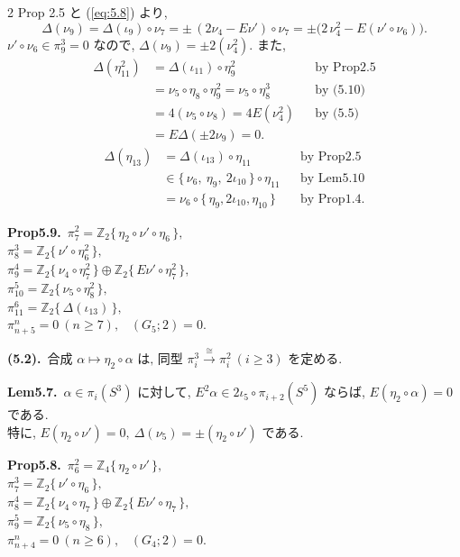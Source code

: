 \documentclass[10pt, leqno]{ltjsarticle}
\newcommand{\toda}[1]{\{\,#1\,\}}              %
\newcommand{\gen}[1]{\{\,#1\,\}}       %
\numberwithin{equation}{section}
\theoremstyle{plain}
\theoremstyle{definition}
\theoremstyle{remark}
\begin{document}
\begin{paracol}{2}
Prop 2.5 と (\ref{eq:5.8}) より,
\[
\Delta(\nu_9)=\Delta(\iota_9)\circ \nu_7=\pm\,(2\nu_4-E\nu')\circ \nu_7
=\pm\big(2\,\nu_4^{2}-E(\nu'\circ \nu_6)\big).
\]
\(\nu'\circ \nu_6\in \pi^{3}_{9}=0\) なので, 
\(\Delta(\nu_9)=\pm 2(\nu_4^{2}) .\) また,
\[
\begin{align*}
\Delta(\eta^{2}_{11})
& =  \Delta(\iota_{11})\circ \eta_9^2
&& \text{by Prop2.5}\\
& =  \nu_5\circ \eta_8\circ \eta_9^2
= \nu_5\circ \eta_8^{3}
&& \text{by (5.10)}\\
& =  4(\nu_5\circ\nu_8)
= 4E(\nu_4^2)
&& \text{by (5.5)}\\
& =  E\Delta(\pm2\nu_9)
=0 .
\end{align*}
\]
\[
\begin{align*}
\Delta(\eta_{13})
& =  \Delta(\iota_{13})\circ \eta_{11}
&& \text{by Prop2.5}\\
& \in \toda{ \nu_6,\ \eta_9,\ 2\iota_{10} }\circ \eta_{11}
&& \text{by Lem5.10}\\
& =  \nu_6\circ\toda{\eta_9,2\iota_{10},\eta_{10}} 
&& \text{by Prop1.4}.
\end{align*}
\]

\switchcolumn

\noindent
\textbf{Prop5.9.}\
\(\pi^{2}_{7}=\mathbb Z_2\gen{\eta_{2}\circ\nu'\circ\eta_6},\) \\
\(\pi^{3}_{8}=\mathbb Z_2\gen{\nu'\circ\eta_6^2},\) \\
\(\pi^{4}_{9}=\mathbb Z_2\gen{\nu_{4}\circ\eta_7^2}\oplus \mathbb Z_2\gen{E\nu'\circ\eta_7^2},\) \\
\(\pi^{5}_{10}=\mathbb Z_2\gen{\nu_{5}\circ\eta_8^2},\) \\
\(\pi^{6}_{11}=\mathbb Z_2\gen{\Delta(\iota_{13})},\) \\
\(\pi^{n}_{n+5}=0\ (n\ge7),\) \
\((G_{5};2)=0.\)

\noindent
\textbf{(5.2).}\
\(\text{合成 } \alpha\longmapsto \eta_2\circ \alpha \text{ は, 同型 } 
\pi^{3}_{i}\xrightarrow{\cong}\pi^{2}_{i}\ (i\ge3) 
\text{ を定める. }\)

\noindent
\textbf{Lem5.7.}\
\(\alpha\in\pi_i(S^3)\) に対して,
\(E^2\alpha\in2\iota_5\circ\pi_{i+2}(S^5)\) ならば, 
\(E(\eta_2\circ\alpha)=0\) である. \\
特に, \(E(\eta_2\circ\nu')=0, \ \Delta(\nu_5)=\pm(\eta_2\circ\nu')\) である. 

\noindent
\textbf{Prop5.8.}\
\(\pi^{2}_{6}=\mathbb Z_4\gen{\eta_{2}\circ\nu'},\) \\
\(\pi^{3}_{7}=\mathbb Z_2\gen{\nu'\circ\eta_6},\) \\
\(\pi^{4}_{8}=\mathbb Z_2\gen{\nu_{4}\circ\eta_7}\oplus \mathbb Z_2\gen{E\nu'\circ\eta_7},\) \\
\(\pi^{5}_{9}=\mathbb Z_2\gen{\nu_{5}\circ\eta_8},\) \\
\(\pi^{n}_{n+4}=0\ (n\ge6),\) \
\((G_{4};2)=0.\)


\end{paracol}
\end{document}
